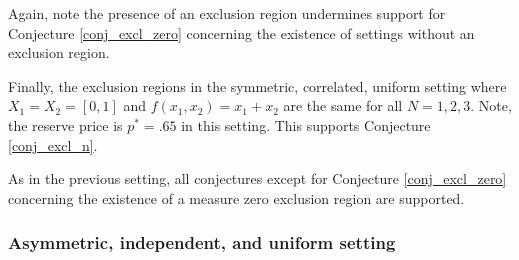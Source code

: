 \noindent Again, note the presence of an exclusion region undermines support for Conjecture \ref{conj_excl_zero} concerning the existence of settings without an exclusion region.

Finally, the exclusion regions in the symmetric, correlated, uniform setting where $X_1 = X_2 = [0,1]$ and $f(x_1,x_2) = x_1 + x_2$ are the same for all $N=1,2,3$. Note, the reserve price is $p^* = .65$ in this setting. This supports Conjecture \ref{conj_excl_n}.





  

As in the previous setting, all conjectures except for Conjecture \ref{conj_excl_zero} concerning the existence of a measure zero exclusion region are supported.








\subsubsection{Asymmetric, independent, and uniform setting}

